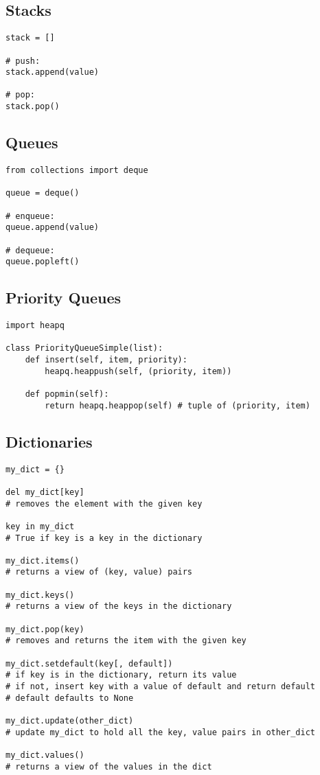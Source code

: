 \documentclass[12pt]{article}
\begin{document}
\subsection{Stacks}
\begin{lstlisting}
stack = []

# push:
stack.append(value)

# pop:
stack.pop()
\end{lstlisting}

\subsection{Queues}
\begin{lstlisting}
from collections import deque

queue = deque()

# enqueue:
queue.append(value)

# dequeue:
queue.popleft()
\end{lstlisting}

\subsection{Priority Queues}
\begin{lstlisting}
import heapq

class PriorityQueueSimple(list):
	def insert(self, item, priority):
		heapq.heappush(self, (priority, item))

	def popmin(self):
		return heapq.heappop(self) # tuple of (priority, item)
\end{lstlisting}

\subsection{Dictionaries}
\begin{lstlisting}
my_dict = {}

del my_dict[key]
# removes the element with the given key

key in my_dict
# True if key is a key in the dictionary

my_dict.items()
# returns a view of (key, value) pairs

my_dict.keys()
# returns a view of the keys in the dictionary

my_dict.pop(key)
# removes and returns the item with the given key

my_dict.setdefault(key[, default])
# if key is in the dictionary, return its value
# if not, insert key with a value of default and return default
# default defaults to None

my_dict.update(other_dict)
# update my_dict to hold all the key, value pairs in other_dict

my_dict.values()
# returns a view of the values in the dict
\end{lstlisting}
\end{document}
